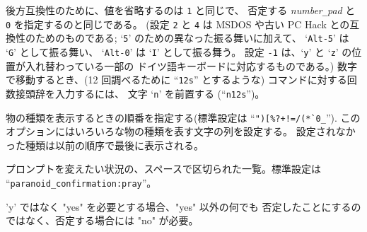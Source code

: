 後方互換性のために、値を省略するのは {\tt 1} と同じで、
否定する {\it number\verb+_+pad\/} と {\tt 0} を指定するのと同じである。
(設定 {\tt 2} と {\tt 4} は MSDOS や古い PC Hack との互換性のためのものである;
`{\tt 5}' のための異なった振る舞いに加えて、
`{\tt Alt-5}' は `{\tt G}' として振る舞い、
`{\tt Alt-0}' は `{\tt I}' として振る舞う。
設定 {\tt -1} は、`{\tt y}' と `{\tt z}' の位置が入れ替わっている一部の
ドイツ語キーボードに対応するものである。)
数字で移動するとき、(12 回調べるために ``{\tt 12s}'' とするような)
コマンドに対する回数接頭辞を入力するには、
文字 `{\tt n}' を前置する (``{\tt n12s}'')。
\item[\ib{packorder}]
物の種類を表示するときの順番を指定する(標準設定は
``\verb&")[%?+!=/(*`0_&'').
このオプションにはいろいろな物の種類を表す文字の列を設定する。
設定されなかった種類は以前の順序で最後に表示される。
\item[\ib{paranoid\verb+_+confirmation}]
プロンプトを変えたい状況の、スペースで区切られた一覧。標準設定は \\
``{\tt paranoid_confirmation:pray}''。
\newlength{\pcwidth}
\settowidth{\pcwidth}{\tt Confirm}
\addtolength{\pcwidth}{\labelsep}
\blist{\leftmargin \pcwidth \topsep 1mm \itemsep 0mm}
\item[{\tt Confirm}]
'y' ではなく "yes" を必要とする場合、"yes" 以外の何でも
否定したことにするのではなく、否定する場合には "no" が必要。
